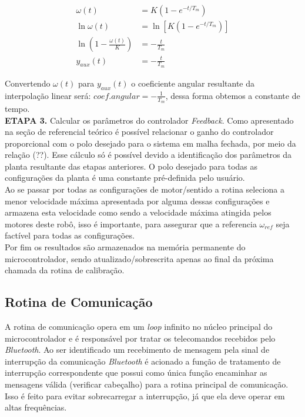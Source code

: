\begin{align*}
    \omega(t) &= K\left( 1 - e^{-t/T_m} \right)\\
    \ln{\omega(t)} &= \ln\left[K( 1 - e^{-t/T_m})\right]\\
    \ln\left(1 - \frac{\omega(t)}{K} \right) &= -\frac{t}{T_m}\\
    y_{aux}(t) &= -\frac{t}{T_m}
\end{align*}

Convertendo $\omega(t)$ para $y_{aux}(t)$ o coeficiente angular resultante da interpolação linear será: $coef.angular = -\frac{1}{T_m}$, dessa forma obtemos a constante de tempo.\\

\textbf{ETAPA 3.} Calcular os parâmetros do controlador \textit{Feedback}. Como apresentado na seção de referencial teórico é possível relacionar o ganho do controlador proporcional com o polo desejado para o sistema em malha fechada, por meio da relação (??). Esse cálculo só é possível devido a identificação dos parâmetros da planta resultante das etapas anteriores. O polo desejado para todas as configurações da planta é uma constante pré-definida pelo usuário.\\
    

Ao se passar por todas as configurações de motor/sentido a rotina seleciona a menor velocidade máxima apresentada por alguma dessas configurações e armazena esta velocidade como sendo a velocidade máxima atingida pelos motores deste robô, isso é importante, para assegurar que a referencia $\omega_{ref}$ seja factível para todas as configurações. \\

Por fim os resultados são armazenados na memória permanente do microcontrolador, sendo atualizado/sobrescrita apenas ao final da próxima chamada da rotina de calibração.

\subsection{Rotina de Comunicação}
A rotina de comunicação opera em um \emph{loop} infinito no núcleo principal do microcontrolador e é responsável por tratar os telecomandos recebidos pelo \textit{Bluetooth}. Ao ser identificado um recebimento de mensagem pela sinal de interrupção da comunicação \textit{Bluetooth} é acionado a função de tratamento de interrupção correspondente que possui como única função encaminhar as mensagens válida (verificar cabeçalho) para a rotina principal de comunicação. Isso é feito para evitar sobrecarregar a interrupção, já que ela deve operar em altas frequências.\\

